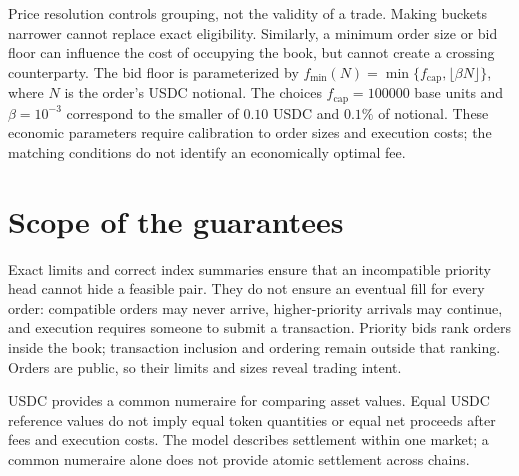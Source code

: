 \documentclass{article}
\begin{document}
Price resolution controls grouping, not the validity of a trade. Making buckets narrower
cannot replace exact eligibility. Similarly, a minimum order size or bid floor can influence
the cost of occupying the book, but cannot create a crossing counterparty. The bid floor is parameterized by $f_{\min}(N)=\min\{f_{\mathrm{cap}},\lfloor\beta N\rfloor\}$, where $N$ is the
order's USDC notional. The choices $f_{\mathrm{cap}}=100000$ base units and $\beta=10^{-3}$
correspond to the smaller of $0.10$ USDC and $0.1\%$ of notional. These economic parameters
require calibration to order sizes and execution costs; the matching conditions do not
identify an economically optimal fee.

\section{Scope of the guarantees}

Exact limits and correct index summaries ensure that an incompatible priority head cannot
hide a feasible pair. They do not ensure an eventual fill for every order: compatible orders
may never arrive, higher-priority arrivals may continue, and execution requires someone to
submit a transaction. Priority bids rank orders inside the book; transaction inclusion and
ordering remain outside that ranking. Orders are public, so their limits and sizes reveal
trading intent.

USDC provides a common numeraire for comparing asset values. Equal USDC reference values do
not imply equal token quantities or equal net proceeds after fees and execution costs.
The model describes settlement within one market; a common numeraire alone does not provide
atomic settlement across chains.

\printbibliography
\end{document}
